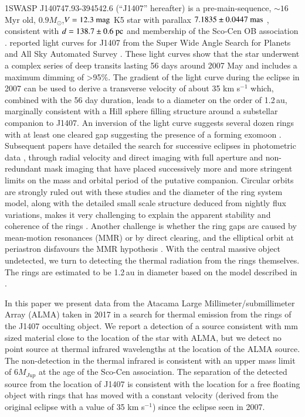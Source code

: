 \documentclass[twocolumn]{aa} %
\newcommand{\kms}{km s$^{-1}$}
\begin{document}
1SWASP J140747.93-394542.6 (``J1407'' hereafter) is a pre-main-sequence, $\sim 16$ Myr old, $0.9M_\odot$,$V=12.3{\rm~mag}$ K5 star with parallax $7.1835\pm 0.0447{\rm~mas}$ \citep{Gaia18}, consistent with  $d=138.7\pm 0.6{\rm~pc}$ \citep{Bailer-Jones18} and membership of the Sco-Cen OB association \citep{Mamajek12}.
%
\citet{Mamajek12} reported  light curves for J1407 from the Super Wide Angle Search for Planets \citep[SuperWASP;][]{Butters10} and All Sky Automated Survey \citep[ASAS;][]{Pojmanski02}.
%
These light curves show that the star underwent a complex series of deep transits lasting 56 days around 2007 May and includes a maximum dimming of >95\%.
%
The gradient of the light curve during the eclipse in 2007 can be used to derive a transverse velocity of about 35 \kms{} which, combined with the 56 day duration, leads to a diameter on the order of 1.2\,au, marginally consistent with a Hill sphere filling structure around a substellar companion to J1407.
%
An inversion of the light curve suggests several dozen rings with at least one cleared gap suggesting the presence of a forming exomoon \citep{Mamajek12,vanWerkhoven14,Kenworthy15b}.
%
Subsequent papers have detailed the search for successive eclipses in photometric data \citep{Kenworthy15b,Mentel18}, through radial velocity and direct imaging with full aperture and non-redundant mask imaging \citep{Kenworthy15} that have placed successively more and more stringent limits on the mass and orbital period of the putative companion.
%
Circular orbits are strongly ruled out with these studies and the diameter of the ring system model, along with the detailed small scale structure deduced from nightly flux variations, makes it very challenging to explain the apparent stability and coherence of the rings \citep{Zanazzi17,Rieder16}.
%
Another challenge is whether the ring gaps are caused by mean-motion resonances (MMR) or by direct clearing, and the elliptical orbit at periastron disfavours the MMR hypothesis \citep{2019MNRAS.tmp..555S}.
%
With the central massive object undetected, we turn to detecting the thermal radiation from the rings themselves.
%
The rings are estimated to be 1.2\,au in diameter based on the model described in \citet{Kenworthy15b}.

In this paper we present data from the Atacama Large Millimeter/submillimeter Array (ALMA) taken in 2017 in a search for thermal emission from the rings of the J1407 occulting object.
%
We report a detection of a source consistent with mm sized material close to the location of the star with ALMA, but we detect no point source at thermal infrared wavelengths at the location of the ALMA source.
%
The non-detection in the thermal infrared is consistent with an upper mass limit of $6M_{Jup}$ at the age of the Sco-Cen association.
%
The separation of the detected source from the location of J1407 is consistent with the location for a free floating object with rings that has moved with a constant velocity (derived from the original eclipse with a value of 35 \kms{}) since the eclipse seen in 2007.
\end{document}
